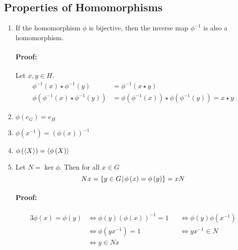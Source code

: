 \documentclass[12pt, oneside]{book}
\DeclarePairedDelimiter{\evdel}{\langle}{\rangle}
\newcommand{\ev}{\evdel}
\newcommand{\given}{\: \vline \:}
\begin{document}
\subsection{Properties of Homomorphisms}
\begin{enumerate}
	\item If the homomorphism \(\phi\) is bijective, then the inverse map \(\phi^{-1}\) is also a homomorphism.
	      \paragraph{Proof:} Let \(x,y \in H\).
	      \begin{align*}
		      \phi^{-1} \left( x \right) \star \phi^{-1} \left( y \right)                   & = \phi^{-1} \left( x \star y \right)                                                                        \\
		      \phi \left( \phi^{-1}\left( x \right) \star \phi^{-1}\left( y \right) \right) & = \phi \left( \phi^{-1} \left(x\right)\right) \star \phi \left( \phi^{-1} \left(y\right)\right) = x \star y
	      \end{align*}
	\item \(\phi\left(e_G\right) = e_H\)
	\item \(\phi\left(x^{-1}\right) = \left(\phi \left(x\right)\right)^{-1}\)
	\item \(\phi\left(\ev{X}\right) = \ev{\phi\left(X\right)}\)
	\item Let \(N = \ker \phi\). Then for all \(x \in G\)
	      \[ Nx = \{y \in G \given \phi \left(x\right) = \phi \left(y\right) \} = xN \]
	      \paragraph{Proof:}
	      \begin{alignat*}{3}
		      \phi \left(x\right) = \phi \left(y\right) & \Longleftrightarrow \phi \left(y\right) \left(\phi \left(x\right)\right)^{-1} = 1 &  & \Longleftrightarrow \phi \left(y\right) \phi\left(x^{-1}\right) \\
		                                                & \Longleftrightarrow \phi \left( yx^{-1} \right) = 1                               &  & \Longleftrightarrow yx^{-1} \in N                               \\
		                                                & \Longleftrightarrow y \in Nx                                                      &  &                                                                 \\
		  \end{alignat*}
\end{enumerate}
\end{document}
